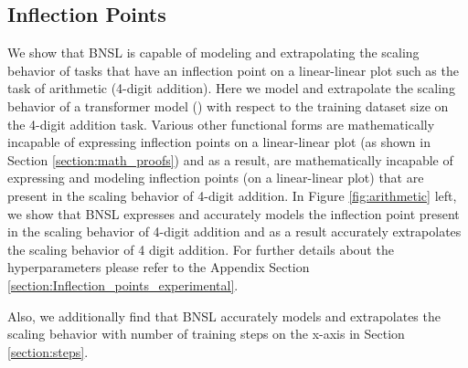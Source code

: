 \documentclass{article} %
\begin{document}
\subsection{Inflection Points}
\label{section:Inflection_Points}
\vspace{-3.0mm}
We show that BNSL is capable of modeling and extrapolating the scaling behavior of tasks that have an inflection point on a linear-linear plot such as the task of arithmetic (4-digit addition). Here we model and extrapolate the scaling behavior of a transformer model (\cite{vaswani2017attention}) with respect to the training dataset size on the 4-digit addition task. Various other functional forms are mathematically incapable of expressing inflection points on a linear-linear plot (as shown in Section \ref{section:math_proofs}) and as a result, are mathematically incapable of expressing and modeling inflection points (on a linear-linear plot) that are present in the scaling behavior of 4-digit addition. In Figure \ref{fig:arithmetic} left, we show that BNSL expresses and accurately models the inflection point present in the scaling behavior of 4-digit addition and as a result accurately extrapolates the scaling behavior of 4 digit addition. For further details about the hyperparameters please refer to the Appendix Section \ref{section:Inflection_points_experimental}.

\vspace{-2.0mm}

Also, we additionally find that BNSL accurately models and extrapolates the scaling behavior with number of training
steps on the x-axis in Section \ref{section:steps}.

\vspace{-3.9mm}
\end{document}
